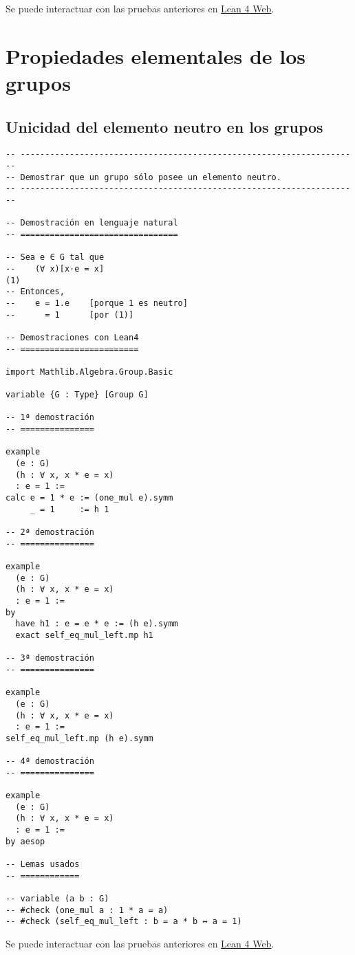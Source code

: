 Se puede interactuar con las pruebas anteriores en \href{https://lean.math.hhu.de/\#url=https://raw.githubusercontent.com/jaalonso/Calculemus2/main/src/Caracterizacion\_de\_producto\_igual\_al\_primer\_factor.lean}{Lean 4 Web}.

\chapter{Propiedades elementales de los grupos}
\label{sec:org863dd3b}

\section{Unicidad del elemento neutro en los grupos}
\label{sec:orge31c5eb}
\begin{verbatim}
-- ---------------------------------------------------------------------
-- Demostrar que un grupo sólo posee un elemento neutro.
-- ---------------------------------------------------------------------

-- Demostración en lenguaje natural
-- ================================

-- Sea e ∈ G tal que
--    (∀ x)[x·e = x]                                                 (1)
-- Entonces,
--    e = 1.e    [porque 1 es neutro]
--      = 1      [por (1)]

-- Demostraciones con Lean4
-- ========================

import Mathlib.Algebra.Group.Basic

variable {G : Type} [Group G]

-- 1ª demostración
-- ===============

example
  (e : G)
  (h : ∀ x, x * e = x)
  : e = 1 :=
calc e = 1 * e := (one_mul e).symm
     _ = 1     := h 1

-- 2ª demostración
-- ===============

example
  (e : G)
  (h : ∀ x, x * e = x)
  : e = 1 :=
by
  have h1 : e = e * e := (h e).symm
  exact self_eq_mul_left.mp h1

-- 3ª demostración
-- ===============

example
  (e : G)
  (h : ∀ x, x * e = x)
  : e = 1 :=
self_eq_mul_left.mp (h e).symm

-- 4ª demostración
-- ===============

example
  (e : G)
  (h : ∀ x, x * e = x)
  : e = 1 :=
by aesop

-- Lemas usados
-- ============

-- variable (a b : G)
-- #check (one_mul a : 1 * a = a)
-- #check (self_eq_mul_left : b = a * b ↔ a = 1)
\end{verbatim}
Se puede interactuar con las pruebas anteriores en \href{https://lean.math.hhu.de/\#url=https://raw.githubusercontent.com/jaalonso/Calculemus2/main/src/Unicidad\_del\_elemento\_neutro\_en\_los\_grupos.lean}{Lean 4 Web}.

